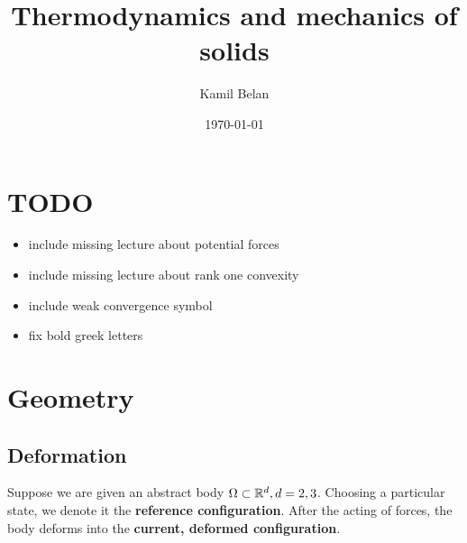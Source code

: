 \documentclass[reqno, a4paper]{article}
\begin{document}
\title{Thermodynamics and mechanics of solids}

\date{\today}

\author{Kamil Belan}



\begin{comment}
\begin{abstract}
  Here comes the abstract.
\end{abstract}
\end{comment}

\maketitle

\tableofcontents

\section{TODO}
\label{sec:todo}

\begin{itemize}
	\item include missing lecture about potential forces 
	\item include missing lecture about rank one convexity
	\item include weak convergence symbol
	\item fix bold greek letters
\end{itemize}

\section{Geometry}
\label{sec:geometry}

\subsection{Deformation}
\label{sec:deformation}

Suppose we are given an abstract body $\Omega \subset {\mathbb R}^d, d=2,3$. Choosing a particular state, we denote it the \textbf{reference configuration}. After the acting of forces, the body deforms into the \textbf{current, deformed configuration}. 

\end{document}
